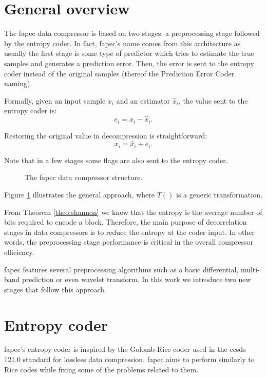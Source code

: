 \section{General overview} \label{sec:fapec_overview}
The \acrshort{fapec} data compressor is based on two stages: a preprocessing stage followed by the entropy coder. In fact, \acrshort{fapec}'s name comes from this architecture as usually the first stage is some type of predictor which tries to estimate the true samples and generates a prediction error. Then, the error is sent to the entropy coder instead of the original samples (thereof the Prediction Error Coder naming).

Formally, given an input sample $x_i$ and an estimator $\hat{x}_i$, the value sent to the entropy coder is:
\begin{equation}
e_i = x_i - \hat{x}_i.
\end{equation}

Restoring the original value in decompression is straightforward:
\begin{equation}
x_i = \hat{x}_i + e_i.
\end{equation}

Note that in a few stages some flags are also sent to the entropy coder.

\begin{figure}[h!]
	\begin{center}
		\scalebox{.615}{}
	\end{center}
	\caption{The \acrshort{fapec} data compressor structure.}
	\label{fig:fapec_structure}
\end{figure}

Figure \ref{fig:fapec_structure} illustrates the general approach, where $T()$ is a generic transformation.

From Theorem \ref{theo:shannon} we know that the entropy is the average number of bits required to encode a block. Therefore, the main purpose of decorrelation stages in data compressors is to reduce the entropy at the coder input. In other words, the preprocessing stage performance is critical in the overall compressor efficiency.

\acrshort{fapec} features several preprocessing algorithms such as a basic differential, multi-band prediction or even wavelet transform. In this work we introduce two new stages that follow this approach.

\section{Entropy coder} \label{sec:entropy_coder}
\acrshort{fapec}'s entropy coder is inspired by the Golomb-Rice coder used in the \acrshort{ccsds} 121.0 standard for lossless data compression. \acrshort{fapec} aims to perform similarly to Rice codes while fixing some of the problems related to them.

